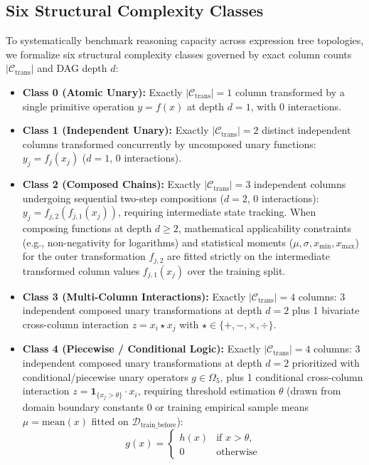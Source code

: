 \documentclass[sigconf]{acmart}
\begin{document}
\subsection{Six Structural Complexity Classes}
To systematically benchmark reasoning capacity across expression tree topologies, we formalize six structural complexity classes governed by exact column counts $|\mathcal{C}_{\text{trans}}|$ and DAG depth $d$:
\begin{itemize}
    \item \textbf{Class 0 (Atomic Unary):} Exactly $|\mathcal{C}_{\text{trans}}| = 1$ column transformed by a single primitive operation $y = f(x)$ at depth $d=1$, with 0 interactions.
    \item \textbf{Class 1 (Independent Unary):} Exactly $|\mathcal{C}_{\text{trans}}| = 2$ distinct independent columns transformed concurrently by uncomposed unary functions: $y_j = f_j(x_j)$ ($d=1$, 0 interactions).
    \item \textbf{Class 2 (Composed Chains):} Exactly $|\mathcal{C}_{\text{trans}}| = 3$ independent columns undergoing sequential two-step compositions ($d=2$, 0 interactions): $y_j = f_{j,2}(f_{j,1}(x_j))$, requiring intermediate state tracking. When composing functions at depth $d \ge 2$, mathematical applicability constraints (e.g., non-negativity for logarithms) and statistical moments ($\mu, \sigma, x_{\min}, x_{\max}$) for the outer transformation $f_{j,2}$ are fitted strictly on the intermediate transformed column values $f_{j,1}(x_j)$ over the training split.
    \item \textbf{Class 3 (Multi-Column Interactions):} Exactly $|\mathcal{C}_{\text{trans}}| = 4$ columns: 3 independent composed unary transformations at depth $d=2$ plus 1 bivariate cross-column interaction $z = x_i \star x_j$ with $\star \in \{+, -, \times, \div\}$.
    \item \textbf{Class 4 (Piecewise / Conditional Logic):} Exactly $|\mathcal{C}_{\text{trans}}| = 4$ columns: 3 independent composed unary transformations at depth $d = 2$ prioritized with conditional/piecewise unary operators $g \in \Omega_5$, plus 1 conditional cross-column interaction $z = \mathbf{1}_{\{x_j > \theta\}} \cdot x_i$, requiring threshold estimation $\theta$ (drawn from domain boundary constants $0$ or training empirical sample means $\mu = \text{mean}(x)$ fitted on $\mathcal{D}_{\text{train\_before}}$):
    \begin{equation}
    g(x) = \begin{cases} h(x) & \text{if } x > \theta, \\ 0 & \text{otherwise} \end{cases}

\end{equation}
\end{itemize}
\end{document}
